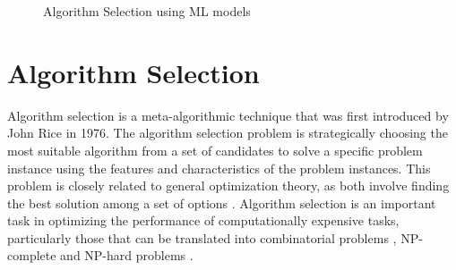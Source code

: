 \begin{figure}
    \centering
    \begin{lrbox}{\mybox}
    \end{lrbox}

    \caption{Algorithm Selection using ML models}
    \label{fig:nativealgselec}
\end{figure}
\section{Algorithm Selection}

Algorithm selection is a meta-algorithmic technique that was first introduced by John Rice \cite{Rice1976} in 1976. The algorithm selection problem is strategically choosing the most suitable algorithm from a set of candidates to solve a specific problem instance using the features and characteristics of the problem instances. This problem is closely related to general optimization theory, as both involve finding the best solution among a set of options \cite{Rice1976}. Algorithm selection is an important task in optimizing the performance of computationally expensive tasks, particularly those that can be translated into combinatorial problems \cite{Kotthoff2014}, NP-complete and NP-hard problems \cite{GCP,10.1109/CEC55065.2022.9870417}.

